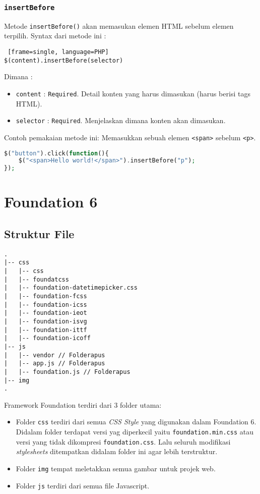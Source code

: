 \subsubsection{\texttt{insertBefore}}
Metode \texttt{insertBefore()} akan memasukan elemen HTML sebelum elemen terpilih.
Syntax dari metode ini :
\begin{lstlisting} [frame=single, language=PHP]
$(content).insertBefore(selector)
\end{lstlisting}
Dimana :
\begin{itemize}
	\item \texttt{content} : \texttt{Required}. Detail konten yang harus dimasukan (harus berisi tags HTML).
	\item \texttt{selector} : \texttt{Required}. Menjelaskan dimana konten akan dimasukan. 
\end{itemize}

Contoh pemakaian metode ini: Memasukkan sebuah elemen \texttt{<span>} sebelum \texttt{<p>}.
\begin{lstlisting}[frame=single, language=PHP]
$("button").click(function(){
	$("<span>Hello world!</span>").insertBefore("p");
});
\end{lstlisting}

\section{Foundation 6}
\subsection{Struktur File}
\begin{lstlisting}[basicstyle=\ttfamily, frame=single,
columns=fullflexible, keepspaces=true, breaklines=true, label=ls:8]
.
|-- css
|   |-- css 
|   |-- foundatcss 
|   |-- foundation-datetimepicker.css 
|   |-- foundation-fcss 
|   |-- foundation-icss 
|   |-- foundation-ieot 
|   |-- foundation-isvg 
|   |-- foundation-ittf 
|   |-- foundation-icoff 
|-- js
|   |-- vendor // Folderapus
|   |-- app.js // Folderapus
|   |-- foundation.js // Folderapus
|-- img
.
\end{lstlisting}

Framework Foundation terdiri dari 3 folder utama:
\begin{itemize}
\item Folder \texttt{css} terdiri dari semua \textit{CSS Style} yang digunakan dalam Foundation 6. Didalam folder terdapat versi yag diperkecil yaitu \verb|foundation.min.css| atau versi yang tidak dikompresi \verb|foundation.css|. Lalu seluruh modifikasi \textit{stylesheets} ditempatkan didalam folder ini agar lebih terstruktur.
\item Folder \texttt{img} tempat meletakkan semua gambar untuk projek web.
\item Folder \texttt{js} terdiri dari semua file Javascript.
\end{itemize} 

